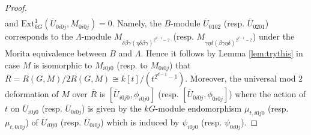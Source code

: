 \documentclass{amsart}
\theoremstyle{plain}
\theoremstyle{definition}
\theoremstyle{remark}
\begin{document}
\begin{proof}
\begin{eqnarray*}
\end{eqnarray*}
and $\mathrm{Ext}^1_{kG}(\overline{U}_{0i0j},M_{0i0j})=0$.
Namely, the $B$-module $\overline{U}_{0102}$ (resp. $\overline{U}_{0201}$)
corresponds to the $\Lambda$-module $M_{\delta\beta\gamma(\eta\delta\beta\gamma)^{2^{d-1}-2}}$
(resp. $M_{\gamma\eta\delta(\beta\gamma\eta\delta)^{2^{d-1}-2}}$)
under the Morita equivalence between $B$ and $\Lambda$.
Hence it follows by Lemma \ref{lem:trythis} in case $M$ is isomorphic to $M_{i0j0}$ (resp. to
$M_{0i0j}$) 
that $\overline{R}=R(G,M)/2R(G,M)\cong k[t]/(t^{2^{d-1}-1})$. Moreover, the universal 
mod $2$ deformation of $M$ over $\overline{R}$ is  
$[\overline{U}_{i0j0},\phi_{i0j0}]$ (resp. $[\overline{U}_{0i0j},\phi_{0i0j}]$)
where the action of $t$ on $\overline{U}_{i0j0}$ (resp. $\overline{U}_{0i0j}$) is 
given by the $kG$-module endomorphism $\mu_{t,i0j0}$ (resp. $\mu_{t,0i0j}$)
of $\overline{U}_{i0j0}$ (resp. $\overline{U}_{0i0j}$)
which is induced by $\psi_{i0j0}$ (resp. $\psi_{0i0j}$).


\end{proof}
\end{document}
